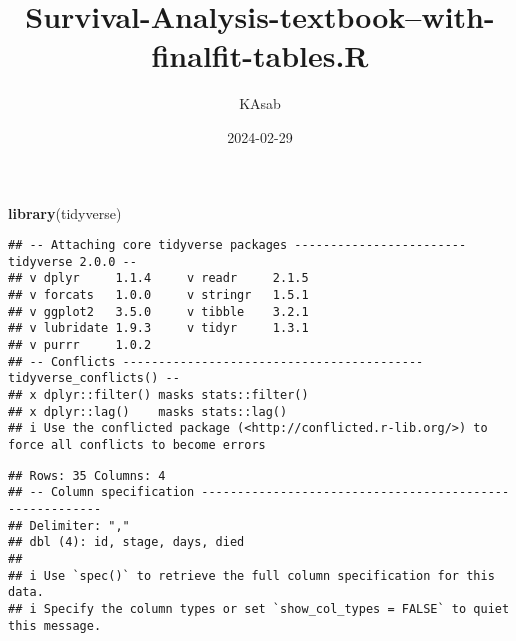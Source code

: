 \documentclass[
]{article}
\title{Survival-Analysis-textbook--with-finalfit-tables.R}
\author{KAsab}
\date{2024-02-29}
\newenvironment{Shaded}{\begin{snugshade}}{\end{snugshade}}
\newcommand{\FunctionTok}[1]{\textcolor[rgb]{0.13,0.29,0.53}{\textbf{#1}}}
\newcommand{\NormalTok}[1]{#1}
\newcommand{\OtherTok}[1]{\textcolor[rgb]{0.56,0.35,0.01}{#1}}
\newcommand{\SpecialCharTok}[1]{\textcolor[rgb]{0.81,0.36,0.00}{\textbf{#1}}}
\newcommand{\StringTok}[1]{\textcolor[rgb]{0.31,0.60,0.02}{#1}}
\begin{document}
\maketitle

\begin{Shaded}
\begin{Highlighting}[]
\FunctionTok{library}\NormalTok{(tidyverse)}
\end{Highlighting}
\end{Shaded}

\begin{verbatim}
## -- Attaching core tidyverse packages ------------------------ tidyverse 2.0.0 --
## v dplyr     1.1.4     v readr     2.1.5
## v forcats   1.0.0     v stringr   1.5.1
## v ggplot2   3.5.0     v tibble    3.2.1
## v lubridate 1.9.3     v tidyr     1.3.1
## v purrr     1.0.2     
## -- Conflicts ------------------------------------------ tidyverse_conflicts() --
## x dplyr::filter() masks stats::filter()
## x dplyr::lag()    masks stats::lag()
## i Use the conflicted package (<http://conflicted.r-lib.org/>) to force all conflicts to become errors
\end{verbatim}

\begin{Shaded}
\end{Shaded}

\begin{verbatim}
## Rows: 35 Columns: 4
## -- Column specification --------------------------------------------------------
## Delimiter: ","
## dbl (4): id, stage, days, died
## 
## i Use `spec()` to retrieve the full column specification for this data.
## i Specify the column types or set `show_col_types = FALSE` to quiet this message.
\end{verbatim}
\end{document}
